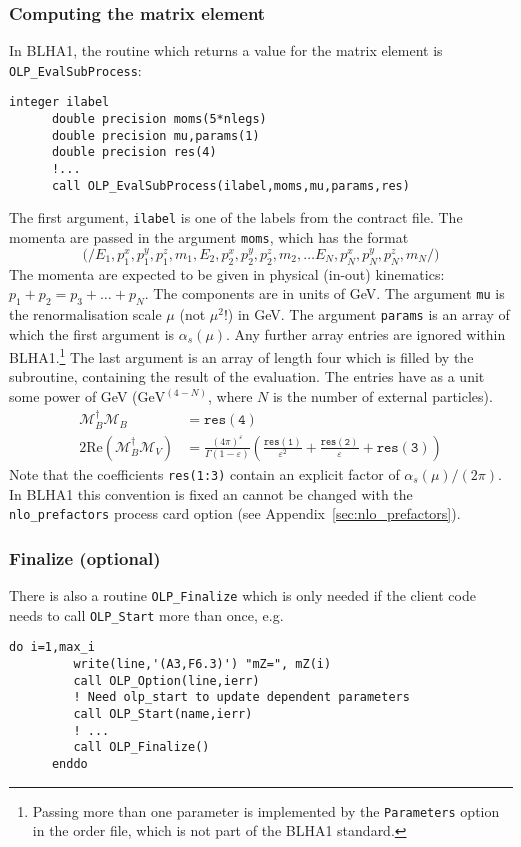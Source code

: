 \subsubsection{Computing the matrix element}
In BLHA1, the routine which returns a value for the matrix element is \texttt{OLP\_EvalSubProcess}:
\begin{lstlisting}[style=fortran]
      integer ilabel
      double precision moms(5*nlegs)
      double precision mu,params(1)
      double precision res(4)
      !...
      call OLP_EvalSubProcess(ilabel,moms,mu,params,res)
\end{lstlisting}
The first argument, \texttt{ilabel} is one of the labels from the contract file. The momenta are passed in the argument \texttt{moms}, which has the format
\begin{displaymath}
\mathtt{(/}
E_1, p^x_1, p^y_1, p^z_1, m_1,
E_2, p^x_2, p^y_2, p^z_2, m_2, \ldots
E_N, p^x_N, p^y_N, p^z_N, m_N
\mathtt{/)}
\end{displaymath}
The momenta are expected to be given in physical (in-out) kinematics: $p_1+p_2=p_3+\ldots+p_N$. The components are in units of GeV. The argument \texttt{mu} is the renormalisation scale $\mu$ (not $\mu^2$!) in GeV. The argument \texttt{params} is an array of which the first argument is $\alpha_s(\mu)$. Any further array entries are ignored within BLHA1.\footnote{Passing more than one parameter is implemented by the \texttt{Parameters} option in the order file, which is  not part of the BLHA1 standard.} The last argument is an array of length four which is filled by the subroutine, containing the result of the evaluation. The entries have as a unit some power of GeV ($\mathrm{GeV}^{(4-N)}$, where $N$ is the number of external particles).
\begin{align}
\label{eq:res}
\mathcal{M}_B^\dagger\mathcal{M}_B&=\mathtt{res(4)}\nonumber\\
2\mathrm{Re}\left(\mathcal{M}_B^\dagger\mathcal{M}_V\right)&=
\frac{(4\pi)^\varepsilon}{\Gamma(1-\varepsilon)}\left(
\frac{\mathtt{res(1)}}{\varepsilon^2}
+\frac{\mathtt{res(2)}}{\varepsilon}
+\mathtt{res(3)}
\right)
\end{align}
Note that the coefficients \texttt{res(1:3)} contain an explicit factor of $\alpha_s(\mu)/(2\pi)$. In BLHA1 this convention is fixed an cannot be changed with the \texttt{nlo\_prefactors} process card option (see Appendix~\ref{sec:nlo_prefactors}).


\subsubsection{Finalize (optional)}
There is also a routine \texttt{OLP\_Finalize} which is only needed if the client code needs to call \texttt{OLP\_Start} more than once, e.g.
\begin{lstlisting}[style=fortran]
      do i=1,max_i
         write(line,'(A3,F6.3)') "mZ=", mZ(i)
         call OLP_Option(line,ierr)
         ! Need olp_start to update dependent parameters
         call OLP_Start(name,ierr)
         ! ...
         call OLP_Finalize()
      enddo
\end{lstlisting}


